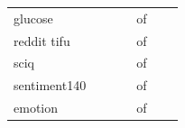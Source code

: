 {\begin{tabular}{lrrrrrr}
    glucose & \AudPtElevenArrive{} & \AudPtElevenEnd{} & \AudPtElevenChanged{} & \AudPtElevenC{} of \AudPtElevenM{} & \AudPtElevenAuditEst{} & \AudPtElevenBound{} \\
    reddit tifu & \AudPtTwelveArrive{} & \AudPtTwelveEnd{} & \AudPtTwelveChanged{} & \AudPtTwelveC{} of \AudPtTwelveM{} & \AudPtTwelveAuditEst{} & \AudPtTwelveBound{} \\
    sciq & \AudPtThirteenArrive{} & \AudPtThirteenEnd{} & \AudPtThirteenChanged{} & \AudPtThirteenC{} of \AudPtThirteenM{} & \AudPtThirteenAuditEst{} & \AudPtThirteenBound{} \\
    sentiment140 & \AudPtFourteenArrive{} & \AudPtFourteenEnd{} & \AudPtFourteenChanged{} & \AudPtFourteenC{} of \AudPtFourteenM{} & \AudPtFourteenAuditEst{} & \AudPtFourteenBound{} \\
    emotion & \AudPtFifteenArrive{} & \AudPtFifteenEnd{} & \AudPtFifteenChanged{} & \AudPtFifteenC{} of \AudPtFifteenM{} & \AudPtFifteenAuditEst{} & \AudPtFifteenBound{} \\
    \bottomrule
\end{tabular}}
